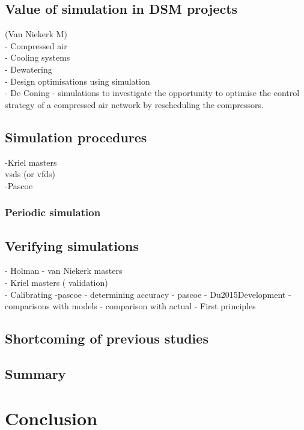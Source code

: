 	\subsection{Value of simulation in DSM projects}
		(Van Niekerk M)\\
		- Compressed air \\
		- Cooling systems\\
		- Dewatering\\
		- Design optimisations using simulation\\
		- De Coning -  simulations to investigate the opportunity to optimise the control strategy of a compressed air network by rescheduling the compressors.
	\subsection{Simulation procedures}
	
		-Kriel masters\\
		 \glspl{vsd} (or \glspl{vfd}) \\
		-Pascoe
		\subsubsection{Periodic simulation}
 	\subsection{Verifying simulations}
 		- Holman
 		- van Niekerk masters\\
 		- Kriel masters ( validation)\\
 		- Calibrating -pascoe
 		- determining accuracy - pascoe
 		- Du2015Development
 		- comparisons with models
 		- comparison with actual 
 		- First principles
 	\subsection{Shortcoming of previous studies}
 	\label{Shortcomings of previous work}
	\subsection{Summary}
\section{Conclusion}